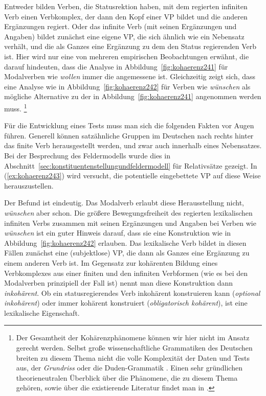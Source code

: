 Entweder bilden Verben, die Statusrektion haben, mit dem regierten infiniten Verb einen Verbkomplex, der dann den Kopf einer VP bildet und die anderen Ergänzungen regiert.
Oder das infinite Verb (mit seinen Ergänzungen und Angaben) bildet zunächst eine eigene VP, die sich ähnlich wie ein Nebensatz verhält, und die als Ganzes eine Ergänzung zu dem den Status regierenden Verb ist.
Hier wird nur eine von mehreren empirischen Beobachtungen erwähnt, die darauf hindeuten, dass die Analyse in Abbildung~\ref{fig:kohaerenz241} für Modalverben wie \textit{wollen} immer die angemessene ist.
Gleichzeitig zeigt sich, dass eine Analyse wie in Abbildung~\ref{fig:kohaerenz242} für Verben wie \textit{wünschen} als mögliche Alternative zu der in Abbildung~\ref{fig:kohaerenz241} angenommen werden muss.%
\footnote{Der Gesamtheit der Kohärenzphänomene können wir hier nicht im Ansatz gerecht werden.
Selbst große wissenschaftliche Grammatiken des Deutschen breiten zu diesem Thema nicht die volle Komplexität der Daten und Tests aus, \zB der \textit{Grundriss} \citep[359--361]{Eisenberg2013b} oder die Duden-Grammatik \citep[§1314--§1323]{Duden8}.
Einen sehr gründlichen theorieneutralen Überblick über die Phänomene, die zu diesem Thema gehören, sowie über die existierende Literatur findet man in \citet[253--275]{Mueller2008}.
}

Für die Entwicklung eines Tests muss man sich die folgenden Fakten vor Augen führen.
Generell können satzähnliche Gruppen im Deutschen nach rechts hinter das finite Verb herausgestellt werden, und zwar auch innerhalb eines Nebensatzes.
Bei der Besprechung des Feldermodells wurde dies in Abschnitt~\ref{sec:konstituentenstellungundfeldermodell} \zB für Relativsätze gezeigt.
In (\ref{ex:kohaerenz243}) wird versucht, die potentielle eingebettete VP auf diese Weise herauszustellen.


\begin{exe}
  \ex\label{ex:kohaerenz243}
  \begin{xlist}
  \end{xlist}
\end{exe}


Der Befund ist eindeutig.
Das Modalverb erlaubt diese Herausstellung nicht, \textit{wünschen} aber schon.
Die größere Bewegungsfreiheit des regierten lexikalischen infiniten Verbs zusammen mit seinen Ergänzungen und Angaben bei Verben wie \textit{wünschen} ist ein guter Hinweis darauf, dass sie eine Konstruktion wie in Abbildung~\ref{fig:kohaerenz242} erlauben.
Das lexikalische Verb bildet in diesen Fällen zunächst eine (subjektlose) VP, die dann als Ganzes eine Ergänzung zu einem anderen Verb ist.
Im Gegensatz zur kohärenten Bildung eines Verbkomplexes aus einer finiten und den infiniten Verbformen (wie es bei den Modalverben prinzipiell der Fall ist) nennt man diese Konstruktion dann \textit{inkohärent}.
Ob ein statusregierendes Verb inkohärent konstruieren kann (\textit{optional inkohärent}) oder immer kohärent konstruiert (\textit{obligatorisch kohärent}), ist eine lexikalische Eigenschaft.

